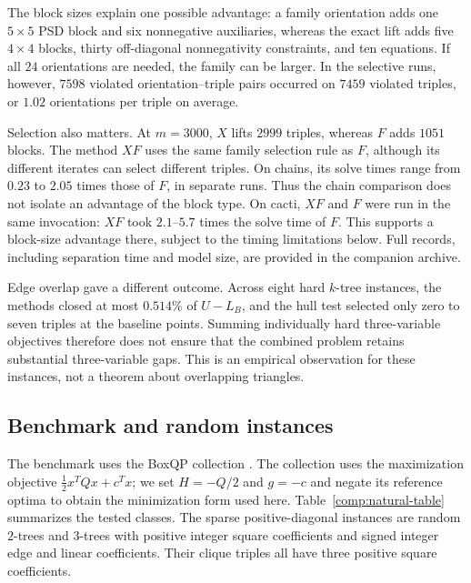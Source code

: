 The block sizes explain one possible advantage: a family orientation
adds one $5\times5$ PSD block and six nonnegative auxiliaries, whereas
the exact lift adds five $4\times4$ blocks, thirty off-diagonal
nonnegativity constraints, and ten equations. If all $24$ orientations
are needed, the family can be larger. In the selective runs, however,
$7598$ violated orientation--triple pairs occurred on $7459$ violated
triples, or $1.02$ orientations per triple on average.

Selection also matters. At $m=3000$, $X$ lifts $2999$ triples,
whereas $F$ adds $1051$ blocks. The method $XF$ uses the same family
selection rule as $F$, although its different iterates can select
different triples. On chains, its solve times range from $0.23$ to
$2.05$ times those of $F$, in separate runs. Thus the chain comparison
does not isolate an advantage of the block type. On cacti, $XF$ and
$F$ were run in the same invocation: $XF$ took $2.1$--$5.7$ times
the solve time of $F$. This supports a block-size advantage there,
subject to the timing limitations below. Full records, including
separation time and model size, are provided in the companion archive.

Edge overlap gave a different outcome. Across eight hard $k$-tree
instances, the methods closed at most $0.514\%$ of $U-L_B$, and
the hull test selected only zero to seven triples at the baseline
points. Summing individually hard three-variable objectives therefore
does not ensure that the combined problem retains substantial
three-variable gaps. This is an empirical observation for these
instances, not a theorem about overlapping triangles.

\subsection{Benchmark and random instances}
\label{comp:natural}

The benchmark uses the BoxQP collection \citep{BurerBoxQPInstances2019}.
The collection uses the maximization objective $\tfrac12x^TQx+c^Tx$;
we set $H=-Q/2$ and $g=-c$ and negate its reference optima to obtain
the minimization form used here.
Table~\ref{comp:natural-table} summarizes the tested classes. The sparse
positive-diagonal instances are random $2$-trees and $3$-trees with
positive integer square coefficients and signed integer edge and
linear coefficients. Their clique triples all have three positive
square coefficients.


